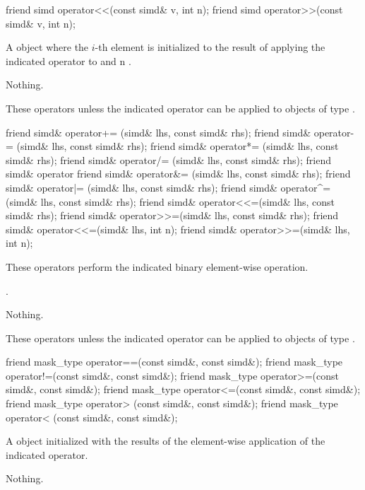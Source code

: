 \begin{itemdecl}
friend simd operator<<(const simd& v, int n);
friend simd operator>>(const simd& v, int n);
\end{itemdecl}
\begin{itemdescr}
  \pnum\returns A \simd object where the $i$-th element is initialized to the result of applying the indicated operator to  and \code n \foralli.

  \pnum\throws Nothing.

  \pnum\remarks These operators \specialsfinae unless the indicated operator can be applied to objects of type .
\end{itemdescr}

\begin{itemdecl}
friend simd& operator+= (simd& lhs, const simd& rhs);
friend simd& operator-= (simd& lhs, const simd& rhs);
friend simd& operator*= (simd& lhs, const simd& rhs);
friend simd& operator/= (simd& lhs, const simd& rhs);
friend simd& operator%
friend simd& operator&= (simd& lhs, const simd& rhs);
friend simd& operator|= (simd& lhs, const simd& rhs);
friend simd& operator^= (simd& lhs, const simd& rhs);
friend simd& operator<<=(simd& lhs, const simd& rhs);
friend simd& operator>>=(simd& lhs, const simd& rhs);
friend simd& operator<<=(simd& lhs, int n);
friend simd& operator>>=(simd& lhs, int n);
\end{itemdecl}
\begin{itemdescr}
  \pnum\effects These operators perform the indicated binary element-wise operation.

  \pnum\returns {}.

  \pnum\throws Nothing.

  \pnum\remarks These operators \specialsfinae unless the indicated operator can be applied to objects of type .
\end{itemdescr}

\begin{itemdecl}
friend mask_type operator==(const simd&, const simd&);
friend mask_type operator!=(const simd&, const simd&);
friend mask_type operator>=(const simd&, const simd&);
friend mask_type operator<=(const simd&, const simd&);
friend mask_type operator> (const simd&, const simd&);
friend mask_type operator< (const simd&, const simd&);
\end{itemdecl}
\begin{itemdescr}
  \pnum\returns A \mask object initialized with the results of the element-wise application of the indicated operator.

  \pnum\throws Nothing.
\end{itemdescr}

